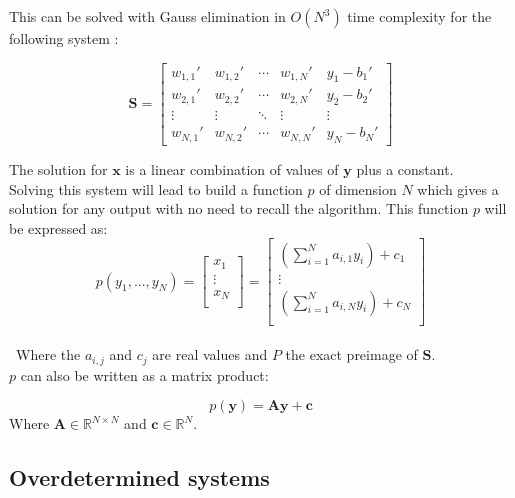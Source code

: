 \documentclass{article}
\begin{document}
    This can be solved with Gauss elimination in $O(N^3)$ time complexity for the following system :

    \begin{equation*}
        \textbf{S}= \left[\begin{array}{cccc|c}  
        w_{1,1}'& w_{1,2}' & \cdots & w_{1,N}' & y_{1}-b_{1}' \\
        w_{2,1}' & w_{2,2}' & \cdots & w_{2,N}' & y_{2}-b_{2}'\\
        \vdots  & \vdots  & \ddots & \vdots & \vdots\\
        w_{N,1}' & w_{N,2}' & \cdots & w_{N,N}' & y_{N}-b_{N}'
       \end{array}\right]
    \end{equation*}

    The solution for $\textbf{x}$ is a linear combination of values of $\textbf{y}$ plus a constant.\\
    Solving this system will lead to build a function $p$ of dimension $N$ which gives a solution for any output with no need to recall the algorithm. This function
    $p$ will be expressed as:
    \begin{equation*}
        p(y_{1},...,y_{N}) = 
        \begin{bmatrix}
            x_{1}\\
            \vdots \\
            x_{N}\\
        \end{bmatrix}
        =
        \begin{bmatrix}
            (\sum_{i=1}^{N} a_{i,1}y_{i}) + c_{1}\\
            \vdots \\
            (\sum_{i=1}^{N} a_{i,N}y_{i}) + c_{N}\\
        \end{bmatrix}
    \end{equation*}
    \\\
    Where the $a_{i,j}$ and $c_{j}$ are real values and $P$ the exact preimage of $\textbf{S}$.\\
    $p$ can also be written as a matrix product:

    \begin{equation*}
        p(\textbf{y}) = \textbf{Ay} + \textbf{c}
    \end{equation*}
Where $\textbf{A} \in  \mathbb{R}^{N \times N}$ and $\textbf{c} \in \mathbb{R}^{N}.$

\subsection{Overdetermined systems}
\end{document}

